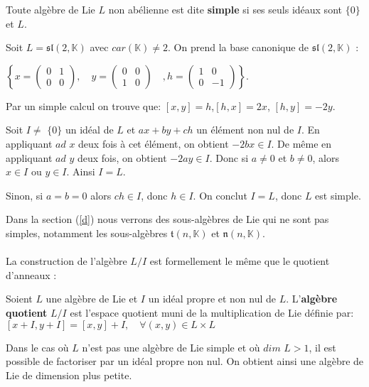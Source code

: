 \documentclass[a4paper,openany,12pt]{report}
\newcommand{\KK}{\mathbb{K}}
\newcommand{\ssl}{\mathfrak{sl}}
\newcommand{\ttt}{\mathfrak{t}}
\newcommand{\nn}{\mathfrak{n}}
\theoremstyle{break}
{\theorembodyfont{\upshape}
\newtheorem*{rmq}{Remarque :}
\newtheorem*{prv}{Preuve :}
\newtheorem*{ex}{Exemples :}
\newtheorem*{exe}{Exemple : }
\newtheorem*{nota}{Notation :}
\newtheorem*{dem}{D\'emonstration :}}
\begin{document}
\begin{df}
\quad Toute algèbre de Lie $L$ non abélienne est dite \textbf{simple} si ses seuls idéaux sont $\{ 0 \}$ et $L$.
\end{df}

\begin{exe}
\quad Soit $L = \ssl(2,\KK)$ avec $car(\KK)\ne 2$. On prend la base canonique de $\ssl(2,\KK)$ : 
\begin{center}
$\left \{ x=\begin{pmatrix} 0 & 1\\ 0 & 0 \end{pmatrix},\quad y=\begin{pmatrix} 0 & 0\\ 1 & 0 \end{pmatrix}\quad, h=\begin{pmatrix} 1 & 0\\ 0 & -1 \end{pmatrix} \right \}$.
\end{center} 

Par un simple calcul on trouve que:  $[x,y]=h$,\quad $[h,x]=2x$, \quad $[h,y]=-2y$.

Soit $I \ne$ $\{0 \}$ un idéal de $L$ et $ax+by+ch$ un élément non nul de $I$. En appliquant  $ad$ $x$ deux fois à cet élément, on obtient $-2bx\in I$. De même en appliquant $ad$ $y$ deux fois, on obtient $-2ay \in I$. Donc si $a \ne 0$ et $b \ne 0$, alors $x \in I $ ou $y \in I$. Ainsi $I=L$.

Sinon, si $a = b = 0$ alors $ch \in I$, donc $h \in I$. On conclut $I=L$, donc $L$ est simple.
\end{exe}

Dans la section (\ref{d}) nous verrons des sous-algèbres de Lie qui ne sont pas simples, notamment les sous-algèbres $\ttt(n,\KK)$ et $\nn(n,\KK)$.\\
\\

La construction de l'algèbre $L / I$ est formellement le même que le quotient d'anneaux :

\begin{df}
\quad Soient $L$ une algèbre de Lie et $I$ un idéal propre et non nul de $L$. L'\textbf{algèbre quotient} $L/I$ est l'espace quotient muni de la multiplication de Lie définie par:
\center $[x+I, y+I]=[x, y]+I, \quad \forall(x, y) \in L \times L$
\end{df}

\begin{rmq}
\quad Dans le cas où $L$ n'est pas une algèbre de Lie simple et où $dim$ $L > 1$, il est possible de factoriser par un idéal propre non nul. On obtient ainsi une algèbre de Lie de dimension plus petite.
\end{rmq}
\end{document}
